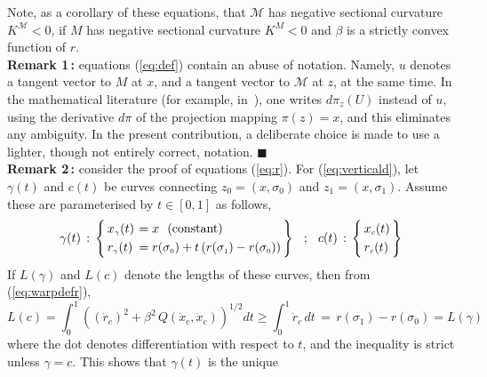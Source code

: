 \documentclass{svmult}
\begin{document}
Note, as a corollary of these equations, that $\mathcal{M}$ has negative sectional curvature $K^\mathcal{M} < 0$, if $M$ has negative sectional curvature $K^M < 0$ and $\beta$ is a strictly convex function of $r$. \\[0.1cm]
\textbf{Remark 1\,:} equations (\ref{eq:def}) contain an abuse of notation. Namely, $u$ denotes a tangent vector to $M$ at $x$, and a tangent vector to $\mathcal{M}$ at $z$, at the same time. In the mathematical literature (for example, in~\cite{bishop,oneil}), one writes $d\pi_z(U)$ instead of $u$, using the derivative $d\pi$ of the projection mapping $\pi(z) = x$, and this eliminates any ambiguity. In the present contribution, a deliberate choice is made to use a lighter, though not entirely correct, notation. \hfill$\blacksquare$\\[0.1cm]
\textbf{Remark 2\,:} consider the proof of equations (\ref{eq:r}). For (\ref{eq:verticald}), let $\gamma(t)$ and $c(t)$ be curves connecting $z_{\scriptscriptstyle 0} = (x,\sigma_{\scriptscriptstyle 0})$ and $z_{\scriptscriptstyle 1} = (x,\sigma_{\scriptscriptstyle 1})$. Assume these are parameterised by $t \in [0,1]$ as follows, 
$$
\gamma(t)\,:\,\left\lbrace\!\! \begin{array}{ll}
x_{\scriptscriptstyle \gamma}(t) \hspace{-0.1cm}& \!\!= x \, \, \text{ (constant)}  \\[0.1cm]
r_{\scriptscriptstyle \gamma}(t) \hspace{-0.3cm}& \!\!= r(\sigma_{\scriptscriptstyle 0}) + t\, (r(\sigma_{\scriptscriptstyle 1})-r(\sigma_{\scriptscriptstyle 0}))
\end{array}\!\!\right\rbrace
\hspace{0.25cm};
\hspace{0.25cm}
c(t)\,:\,\left\lbrace\!\! \begin{array}{l}
x_{\scriptscriptstyle c}(t) \\[0.1cm]
r_{\scriptscriptstyle c}(t)
\end{array}\!\!\right\rbrace
$$
If $L(\gamma)$ and $L(c)$ denote the lengths of these curves, then from (\ref{eq:warpdefr}),
$$
L(c) = \int^1_0 \left( \left(\dot{r}_{\scriptscriptstyle c}\right)^2 + \beta^2\, Q(\dot{x}_{\scriptscriptstyle c},\dot{x}_{\scriptscriptstyle c})\right)^{1/2}dt \geq\int^1_0 \dot{r}_{\scriptscriptstyle c}\,dt
\,=\, r(\sigma_{\scriptscriptstyle 1})-r(\sigma_{\scriptscriptstyle 0}) = L(\gamma)$$
where the dot denotes differentiation with respect to $t$, and the inequality is strict unless $\gamma = c$. This shows that $\gamma(t)$ is the unique 
\end{document}
